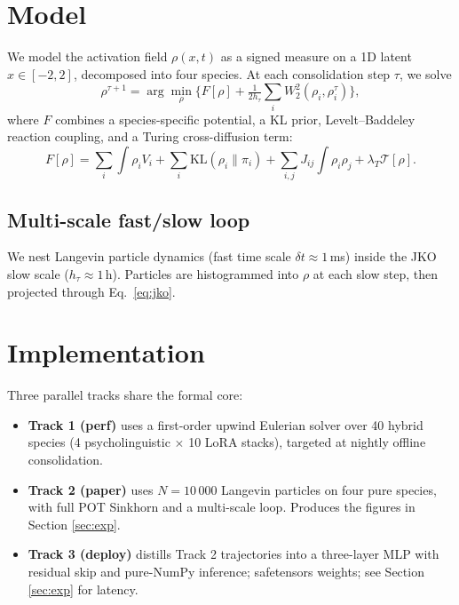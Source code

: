\documentclass[11pt]{article}
\begin{document}
\section{Model}
\label{sec:model}

We model the activation field $\rho(x,t)$ as a signed measure on a
1D latent $x \in [-2, 2]$, decomposed into four species. At each
consolidation step $\tau$, we solve
\begin{equation}
  \rho^{\tau+1} = \arg\min_{\rho} \Big\{ F[\rho] +
      \tfrac{1}{2h_\tau} \sum_{i} W_2^2(\rho_i, \rho_i^\tau) \Big\},
  \label{eq:jko}
\end{equation}
where $F$ combines a species-specific potential, a KL prior,
Levelt--Baddeley reaction coupling, and a Turing cross-diffusion term:
\begin{equation}
  F[\rho] = \sum_i \int \rho_i V_i + \sum_i \mathrm{KL}(\rho_i \| \pi_i)
          + \sum_{i,j} J_{ij} \int \rho_i \rho_j + \lambda_T \mathcal{T}[\rho].
  \label{eq:freeenergy}
\end{equation}

\subsection{Multi-scale fast/slow loop}
We nest Langevin particle dynamics (fast time scale $\delta t \approx 1\,$ms)
inside the JKO slow scale ($h_\tau \approx 1\,$h). Particles are
histogrammed into $\rho$ at each slow step, then projected through
Eq.~\ref{eq:jko}.

\section{Implementation}
\label{sec:impl}

Three parallel tracks share the formal core:
\begin{itemize}
  \item \textbf{Track 1 (perf)} uses a first-order upwind Eulerian
        solver over 40 hybrid species (4 psycholinguistic $\times$ 10
        LoRA stacks), targeted at nightly offline consolidation.
  \item \textbf{Track 2 (paper)} uses $N=10\,000$ Langevin particles on
        four pure species, with full POT Sinkhorn and a multi-scale
        loop. Produces the figures in Section \ref{sec:exp}.
  \item \textbf{Track 3 (deploy)} distills Track 2 trajectories into a
        three-layer MLP with residual skip and pure-NumPy inference;
        safetensors weights; see Section \ref{sec:exp} for latency.
\end{itemize}
\end{document}
